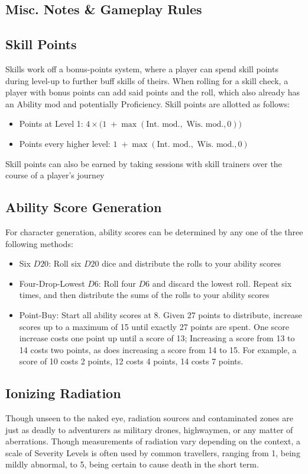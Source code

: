 \documentclass[12pt, twoside]{article}
\begin{document}
\begin{FlushLeft}
\begin{multicols}{2}
			\section{Misc. Notes \& Gameplay Rules}
			\subsection{Skill Points}
			Skills work off a bonus-points system, where a player can spend skill points during level-up to further buff skills of theirs.
			When rolling for a skill check, a player with bonus points can add said points and the roll, which also already has an Ability mod and potentially Proficiency.
			Skill points are allotted as follows:
			\begin{itemize}
				\item Points at Level 1: \linebreak $4 \times \big(1 \; + \max(\text{Int. mod.}, \text{ Wis. mod.}, 0)\big)$
				\item Points every higher level: \linebreak $1 \; + \max(\text{Int. mod.}, \text{ Wis. mod.}, 0)$
			\end{itemize}
			Skill points can also be earned by taking sessions with skill trainers over the course of a player's journey
			\subsection{Ability Score Generation}
			For character generation, ability scores can be determined by any one of the three following methods:
			\begin{itemize}[wide]
				\item Six $D20$: Roll six $D20$ dice and distribute the rolls to your ability scores
				\item Four-Drop-Lowest $D6$: Roll four $D6$ and discard the lowest roll. Repeat six times, and then distribute the sums of the rolls to your ability scores
				\item Point-Buy: Start all ability scores at 8. Given 27 points to distribute, increase scores up to a maximum of 15 until exactly 27 points are spent. One score increase costs one point up until a score of 13; Increasing a score from 13 to 14 costs two points, as does increasing a score from 14 to 15. For example, a score of 10 costs 2 points, 12 costs 4 points, 14 costs 7 points.
			\end{itemize}
			\vfill \null \columnbreak
			\subsection{Ionizing Radiation}
			Though unseen to the naked eye, radiation sources and contaminated zones are just as deadly to adventurers as military drones, highwaymen, or any matter of aberrations.
			Though measurements of radiation vary depending on the context, a scale of Severity Levels is often used by common travellers, ranging from 1, being mildly abnormal, to 5, being certain to cause death in the short term. \linebreak


\end{multicols}
\end{FlushLeft}
\end{document}
